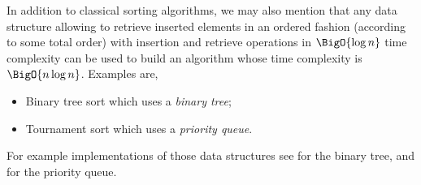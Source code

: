 In addition to classical sorting algorithms, we may also
mention that any data structure allowing to retrieve inserted elements in an
ordered fashion (according to some total order) with insertion and retrieve
operations in $\BigO{\log n}$ time complexity can be used to build an algorithm
whose time complexity is $\BigO{n \log n}$. Examples are,

\begin{itemize}
\item Binary tree sort which uses a \emph{binary tree};
\item Tournament sort which uses a \emph{priority queue}.
\end{itemize}

For example implementations of those data structures see
\citet*{sleator:1985} for the binary tree, and
\citet*{leiserson:2001} for the priority queue.
